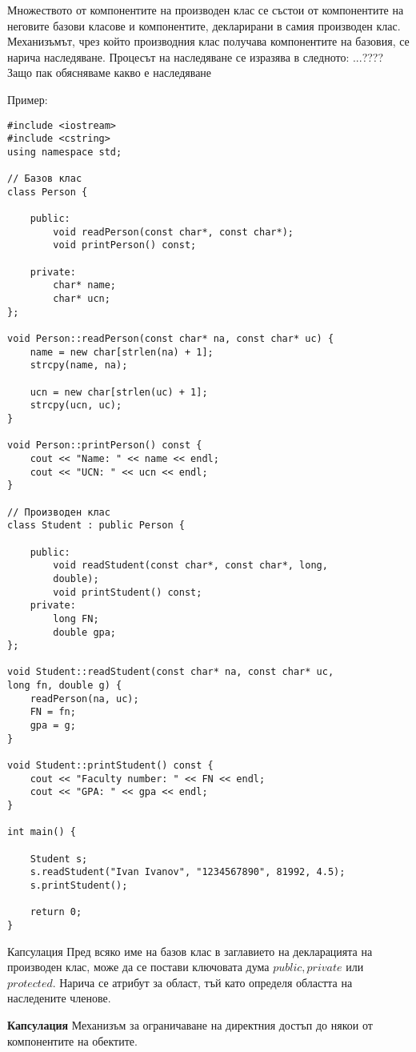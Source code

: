 \documentclass{article}
\begin{document}
Множеството от компонентите на производен клас се състои от компонентите на неговите базови класове и компонентите, декларирани
в самия производен клас. Механизъмът, чрез който производния клас получава компонентите на базовия, се нарича наследяване.
Процесът на наследяване се изразява в следното: ...???? Защо пак обясняваме какво е наследяване

Пример: \begin{lstlisting}
#include <iostream>
#include <cstring>
using namespace std;

// Базов клас
class Person {

    public:
        void readPerson(const char*, const char*);
        void printPerson() const;

    private:
        char* name;
        char* ucn;
};

void Person::readPerson(const char* na, const char* uc) {
    name = new char[strlen(na) + 1];
    strcpy(name, na);

    ucn = new char[strlen(uc) + 1];
    strcpy(ucn, uc);
}

void Person::printPerson() const {
    cout << "Name: " << name << endl;
    cout << "UCN: " << ucn << endl; 
}

// Производен клас
class Student : public Person {
    
    public:
        void readStudent(const char*, const char*, long,
        double);
        void printStudent() const;
    private:
        long FN;
        double gpa;
};

void Student::readStudent(const char* na, const char* uc,
long fn, double g) {
    readPerson(na, uc);
    FN = fn;
    gpa = g;
}

void Student::printStudent() const {
    cout << "Faculty number: " << FN << endl;
    cout << "GPA: " << gpa << endl; 
}

int main() {

    Student s;
    s.readStudent("Ivan Ivanov", "1234567890", 81992, 4.5);
    s.printStudent();

    return 0;
}
\end{lstlisting}

Капсулация
Пред всяко име на базов клас в заглавието на декларацията на производен клас, може да се постави ключовата дума $public, private$
или $protected$. Нарича се атрибут за област, тъй като определя областта на наследените членове. 

\textbf{{Капсулация}} \newline
Механизъм за ограничаване на директния достъп до някои от компонентите на обектите.
\end{document}
